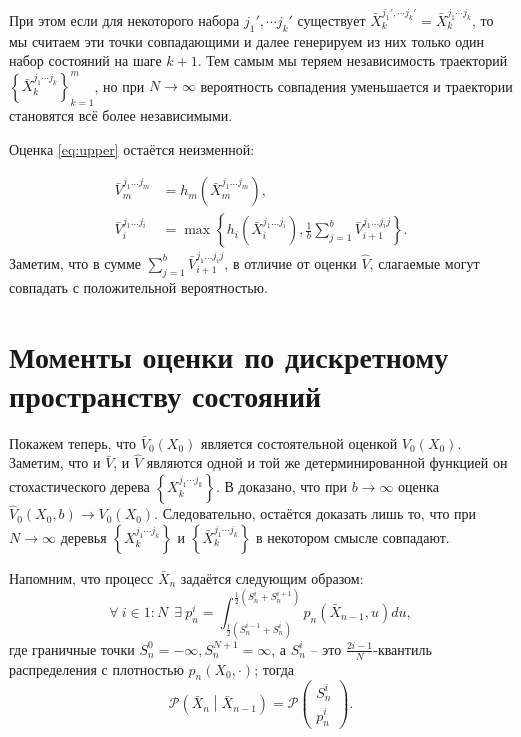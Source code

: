 \documentclass[specialist,
               substylefile = ../spbu.rtx,
               subf,href,colorlinks=true, 12pt]{disser}
\newcommand{\Vhat}{\hat{V}}
\newcommand{\Vbar}{\bar{V}}
\begin{document}
    При этом если для некоторого набора $j_1',\cdots j_k'$ существует $\bar X_k^{j_1',\cdots j_k'} = \bar X_k^{j_1\cdots j_k}$, то мы считаем эти точки совпадающими и далее генерируем из них только один набор состояний на шаге $k+1$. Тем самым мы теряем независимость траекторий $\left\lbrace \bar X_k^{j_1\cdots j_k}\right\rbrace_{k=1}^m$, но при $N \to \infty$ вероятность совпадения уменьшается и траектории становятся всё более независимыми.

    Оценка \eqref{eq:upper} остаётся неизменной:

    \begin{equation}\label{eq:discrete}\begin{aligned}
            \Vbar_m^{j_1 \ldots j_m} &= h_m\left(\bar X_m^{j_1 \ldots j_m}\right), \\
            \Vbar_i^{j_1 \ldots j_i} &= \max \left\lbrace h_i \left( \bar X_i^{j_1 \ldots j_i} \right), \frac{1}{b} \sum_{j = 1}^b \Vbar_{i+1}^{j_1 \ldots j_i j}\right\rbrace.
    \end{aligned}\end{equation}
    Заметим, что в сумме $\sum_{j = 1}^b \Vbar_{i+1}^{j_1 \ldots j_i j}$, в отличие от оценки $\Vhat$, слагаемые могут совпадать с положительной вероятностью.

\chapter{Моменты оценки по дискретному пространству состояний}
    
    Покажем теперь, что $\Vbar_0(X_0)$ является состоятельной оценкой $V_0(X_0)$. Заметим, что и $\Vbar$, и $\Vhat$ являются одной и той же детерминированной функцией он стохастического дерева $\left\lbrace X_k^{j_1\cdots j_k}\right\rbrace$. В \cite{Broadie1997} доказано, что при $b \to \infty$ оценка $\Vhat_0(X_0, b)\to V_0(X_0)$. Следовательно, остаётся доказать лишь то, что при $N\to\infty$ деревья $\left\lbrace X_k^{j_1\cdots j_k}\right\rbrace$ и $\left\lbrace \bar X_k^{j_1\cdots j_k}\right\rbrace$ в некотором смысле совпадают.

    Напомним, что процесс $\bar X_n$ задаётся следующим образом:  
    $$\forall\:i\in 1\mathbin : N\:\: \exists\: p_n^i = \int_{\frac{1}{2}\left(S_n^{i-1} + S_n^{i}\right)}^{\frac{1}{2}\left(S_n^{i} + S_n^{i+1}\right)} p_n\left(\bar X_{n-1}, u\right) du,$$ 
    где граничные точки $S_n^0 = -\infty, S_n^{N+1} = \infty$, а $S_n^i$ -- это $\frac{2i-1}{N}$-квантиль распределения с плотностью $p_n\left(X_0, \cdot\right)$; тогда
    $$\mathcal P\left(\bar X_n\middle\vert \bar X_{n-1}\right) = \mathcal P \begin{pmatrix} S_n^i\\ p_n^i \end{pmatrix}.$$
\end{document}
